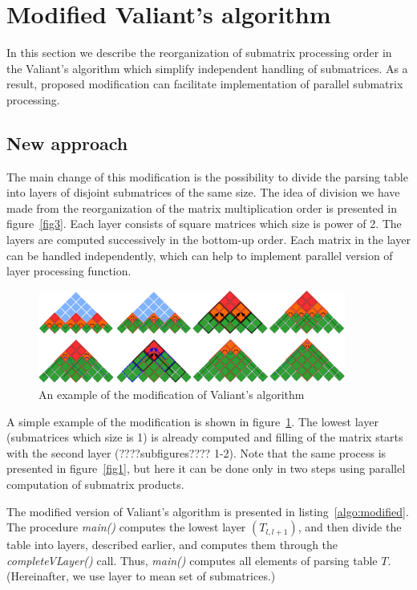 \section{Modified Valiant's algorithm}

In this section we describe the reorganization of submatrix processing order in the Valiant's algorithm which simplify independent handling of submatrices. As a result, proposed modification can facilitate implementation of parallel submatrix processing.

\subsection{New approach}

The main change of this modification is the possibility to divide the parsing table into layers of disjoint submatrices of the same size.
The idea of division we have made from the reorganization of the matrix multiplication order is presented in figure~\ref{fig3}.
Each layer consists of square matrices which size is power of 2.
The layers are computed successively in the bottom-up order.
Each matrix in the layer can be handled independently, which can help to implement parallel version of layer processing function.

\begin{figure}
    \centering
    \includegraphics[width=0.9\textwidth]{pictures/modivis.pdf}
    \caption{An example of the modification of Valiant's algorithm}
    \label{fig4}
\end{figure}

A simple example of the modification is shown in figure~\ref{fig4}. 
The lowest layer (submatrices which size is 1) is already computed and filling of the matrix starts with the second layer (????subfigures???? 1-2). 
Note that the same  process is presented in figure~\ref{fig1}, but here it can be done only in two steps using parallel computation of submatrix products.

The modified version of Valiant's algorithm is presented in listing~\ref{algo:modified}.
The procedure \textit{main()} computes the lowest layer $(T_{l, l+1})$, and then divide the table into layers, described earlier, and computes them through the \textit{completeVLayer()} call.
Thus, \textit{main()} computes all elements of parsing table $T$.
(Hereinafter, we use layer to mean set of submatrices.)

